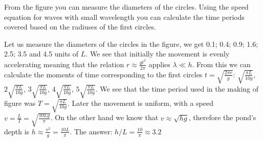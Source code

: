 {\ifEngHint
From the figure you can measure the diameters of the circles. Using the speed equation for waves with small wavelength you can calculate the time periods covered based on the radiuses of the first circles.
\fi


\ifEngSolution
Let us measure the diameters of the circles in the figure, we get 0.1; 0.4; 0.9; 1.6; 2.5; 3.5 and 4.5 units of $L$. We see that initially the movement is evenly accelerating meaning that the relation $r \approx \frac{gt^2}{2 \pi}$ applies $\lambda \ll h$. From this we can calculate the moments of time corresponding to the first circles $t = \sqrt{\frac{2 \pi r}{g}}$: $\sqrt{\frac{\pi L}{10 g}}$, $2 \sqrt{\frac{\pi L}{10 g}}$, $3 \sqrt{\frac{\pi L}{10 g}}$, $4 \sqrt{\frac{\pi L}{10 g}}$, $5 \sqrt{\frac{\pi L}{10 g}}$. We see that the time period used in the making of figure was $T=\sqrt{\frac{\pi L}{10 g}}$. Later the movement is uniform, with a speed $v=\frac{L}{T}=\sqrt{\frac{10 L g}{\pi}}$. On the other hand we know that $v \approx \sqrt{hg}$, therefore the pond's depth is $h \approx \frac{v^2}{g} = \frac{10 L}{\pi}$. The answer: $h/L = \frac{10}{\pi} \approx \SI{3,2}{}$
\fi
}